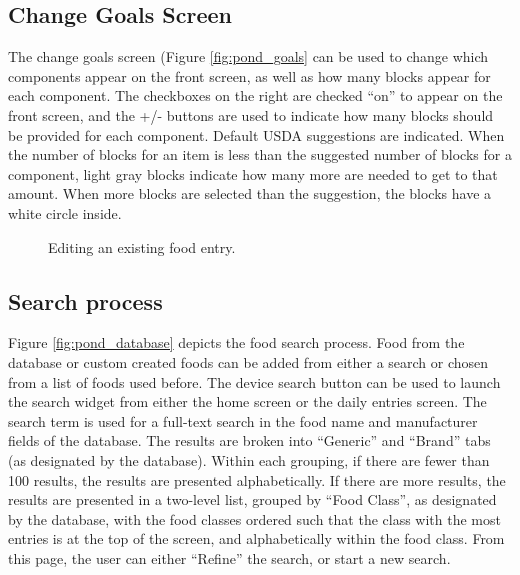 \subsection{Change Goals Screen}
The change goals screen (Figure \ref{fig:pond_goals} can be used to change which components appear on the front screen, as well as how many blocks appear for each component. The checkboxes on the right are checked ``on'' to appear on the front screen, and the +/- buttons are used to indicate how many blocks should be provided for each component. Default USDA suggestions are indicated. When the number of blocks for an item is less than the suggested number of blocks for a component, light gray blocks indicate how many more are needed to get to that amount. When more blocks are selected than the suggestion, the blocks have a white circle inside. 


\begin{figure}[ t ]
\centering
\setlength\fboxsep{0pt}
\setlength\fboxrule{0.5pt}
\label{fig:pond_record_edit}

\caption{Editing an existing food entry. }
\end{figure}

\subsection{Search process}
Figure \ref{fig:pond_database} depicts the food search process. Food from the database or custom created foods can be added from either a search or chosen from a list of foods used before. The device search button can be used to launch the search widget from either the home screen or the daily entries screen. The search term is used for a full-text search in the food name and manufacturer fields of the database. The results are broken into ``Generic'' and ``Brand'' tabs (as designated by the database). Within each grouping, if there are fewer than 100 results, the results are presented alphabetically. If there are more results, the results are presented in a two-level list, grouped by ``Food Class'', as designated by the database, with the food classes ordered such that the class with the most entries is at the top of the screen, and alphabetically within the food class. From this page, the user can either ``Refine'' the search, or start a new search. 

